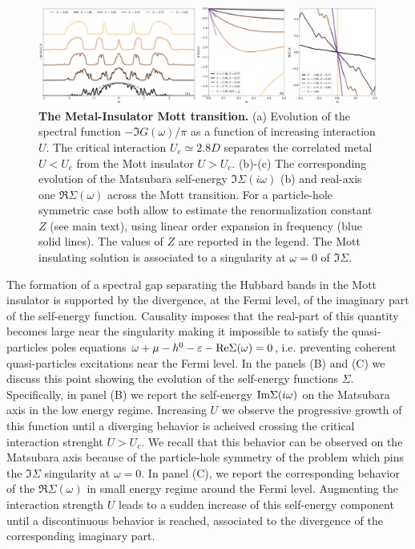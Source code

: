 \documentclass[edipack2.tex]{subfiles}
\begin{document}
\begin{figure}[t!]
  \includegraphics[width=\linewidth]{figures/figBethe.pdf}
    \caption{\label{figEx1}%
      \textbf{The Metal-Insulator Mott transition.}
      (a) Evolution of the spectral function $-\Im{G}(\omega)/\pi$ as
      a function of increasing interaction $U$. The critical
      interaction $U_c\simeq 2.8D$ separates the correlated metal $U<U_c$ from
      the Mott insulator $U>U_c$.
      (b)-(c) The corresponding evolution of the Matsubara self-energy
      $\Im\Sigma(i\omega)$ (b) and
      real-axis one $\Re\Sigma(\omega)$ across the Mott
      transition. For a particle-hole symmetric case both allow to
      estimate the renormalization constant $Z$ (see main text), using
      linear order expansion in frequency (blue solid lines). The
      values of $Z$ are reported in the legend.
      The Mott insulating solution is associated to a singularity at
      $\omega=0$ of $\Im\Sigma$. 
        }
\end{figure}

The formation of a spectral gap separating the Hubbard bands in the
Mott insulator is supported by the divergence, at the Fermi level, of the imaginary part of
the self-energy function. Causality imposes that the real-part of
this quantity becomes large near the singularity making it impossible
to satisfy the quasi-particles poles equations
$\omega+\mu-h^0-\varepsilon-{\rm Re}{\Sigma}(\omega)=0$, i.e. preventing coherent
quasi-particles excitations near the Fermi level. 
In the panels (B) and (C) we discuss this point  showing the evolution
of the self-energy functions $\Sigma$.
Specifically, in panel (B) we report the self-energy ${\rm Im}\Sigma(i\omega)$
on the Matsubara axis in the low energy regime. Increasing $U$
we observe the progressive growth of this function until a
diverging behavior is acheived crossing the critical interaction
strenght $U>U_c$.
We recall that this behavior can be observed on the Matsubara axis
because of the particle-hole symmetry of the problem which pins the
$\Im{\Sigma}$ singularity at $\omega=0$.
In panel (C), we report the corresponding behavior of the
$\Re{\Sigma}(\omega)$ in small energy regime around the Fermi
level. Augmenting the interaction strength $U$ leads to a sudden
increase of this self-energy component until a discontinuous behavior
is reached, associated to the divergence of the corresponding
imaginary part.   
\end{document}
